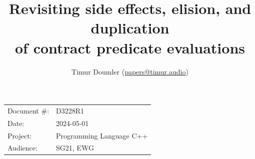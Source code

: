 

 \usepackage[bottom]{footmisc} 

 \usepackage{longtable}


\usepackage{tikz,lipsum,lmodern}
\usepackage[most]{tcolorbox}



\usepackage{titlesec}
\usepackage{tocloft}


\newcommand{\changelocaltocdepth}[1]{%
  \addtocontents{toc}{\protect\setcounter{tocdepth}{#1}}%
  \setcounter{tocdepth}{#1}%
}

\setcounter{tocdepth}{3}



\title{Revisiting side effects, elision, and duplication \\ of contract predicate evaluations}
\author{ Timur Doumler \small(\href{mailto:papers@timur.audio}{papers@timur.audio}) 
}
\date{}
\maketitle

\begin{tabular}{ll}
Document \#: & D3228R1 \\
Date: &2024-05-01 \\
Project: & Programming Language C++ \\
Audience: & SG21, EWG
\end{tabular}

